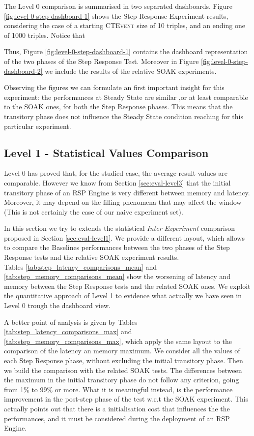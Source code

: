 The Level 0 comparison is summarised in two separated dashboards. Figure \ref{fig:level-0-step-dashboard-1} shows the Step Response Experiment results, considering the case of a starting \textsc{CTEvent} size of 10 triples, and an ending one of 1000 triples.
Notice that 


Thus, Figure \ref{fig:level-0-step-dashboard-1} contains the dashboard representation of the two phases of the Step Response Test. Moreover in Figure \ref{fig:level-0-step-dashboard-2} we include the results of the relative SOAK experiments. 

Observing the figures we can formulate an first important insight for this experiment: the performances at Steady State are similar ,or at least comparable to the SOAK ones, for both the Step Response phases. This means that the transitory phase does not influence the Steady State condition reaching for this particular experiment.

\subsection{Level 1 - Statistical Values Comparison}\label{sec:level1-step-stats}

Level 0 has proved that, for the studied case, the average result values are comparable. However we know from Section \ref{sec:eval-level3} that the initial transitory phase of an RSP Engine is very different between memory and latency. Moreover, it may depend on the filling phenomena that may affect the window (This is not certainly the case of our naive experiment set).

In this section we try to extends the statistical \textit{Inter Experiment} comparison proposed in Section \ref{sec:eval-level1}. We provide a different layout, which allows to compare the Baselines performances between the two phases of the Step Response tests and the relative SOAK experiment results.\\

Tables \ref{tab:step_latency_comparisons_mean} and \ref{tab:step_memory_comparisons_mean} show the worsening of latency and memory between the Step Response tests and the related SOAK ones. We exploit the quantitative approach of Level 1 to evidence what actually we have seen in Level 0 trough the dashboard view.

A better point of analysis is given by Tables \ref{tab:step_latency_comparisons_max} and \ref{tab:step_memory_comparisons_max}, which apply the same layout to the comparison of the latency an memory maximum. We consider all the values of each Step Response phase, without excluding the initial transitory phase. Then we build the comparison with the related SOAK tests. The differences between the maximum in the initial transitory phase do not follow any criterion, going from 1\% to 99\% or more. What it is meaningful instead, is the performance improvement in the post-step phase of the test w.r.t the SOAK experiment. This actually points out that there is a initialisation cost that influences the the performances, and it must be considered during the deployment of an RSP Engine.

